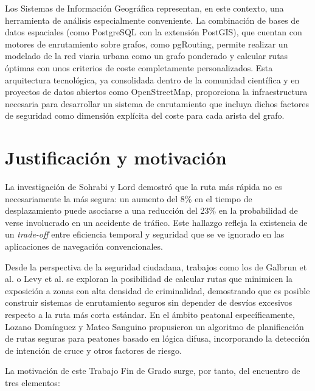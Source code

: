 Los Sistemas de Información Geográfica representan, en este contexto, una herramienta de análisis especialmente conveniente. La combinación de bases de datos espaciales (como PostgreSQL con la extensión PostGIS), que cuentan con motores de enrutamiento sobre grafos, como pgRouting, permite realizar un modelado de la red viaria urbana como un grafo ponderado y calcular rutas óptimas con unos criterios de coste completamente personalizados. Esta arquitectura tecnológica, ya consolidada dentro de la comunidad científica y en proyectos de datos abiertos como OpenStreetMap, proporciona la infraestructura necesaria para desarrollar un sistema de enrutamiento que incluya dichos factores de seguridad como dimensión explícita del coste para cada arista del grafo.

\section{Justificación y motivación}
\label{sec:motivacion}

La investigación de Sohrabi y Lord \cite{sohrabilord2022} demostró que la ruta más rápida no es necesariamente la más segura: un aumento del 8\% en el tiempo de desplazamiento puede asociarse a una reducción del 23\% en la probabilidad de verse involucrado en un accidente de tráfico. Este hallazgo refleja la existencia de un \textit{trade-off} entre eficiencia temporal y seguridad que se ve ignorado en las aplicaciones de navegación convencionales.

Desde la perspectiva de la seguridad ciudadana, trabajos como los de Galbrun et al. \cite{galbrun2016} o Levy et al. \cite{levy2020} se exploran la posibilidad de calcular rutas que minimicen la exposición a zonas con alta densidad de criminalidad, demostrando que es posible construir sistemas de enrutamiento seguros sin depender de desvíos excesivos respecto a la ruta más corta estándar. En el ámbito peatonal específicamente, Lozano Domínguez y Mateo Sanguino \cite{lozano2021} propusieron un algoritmo de planificación de rutas seguras para peatones basado en lógica difusa, incorporando la detección de intención de cruce y otros factores de riesgo.

La motivación de este Trabajo Fin de Grado surge, por tanto, del encuentro de tres elementos:

